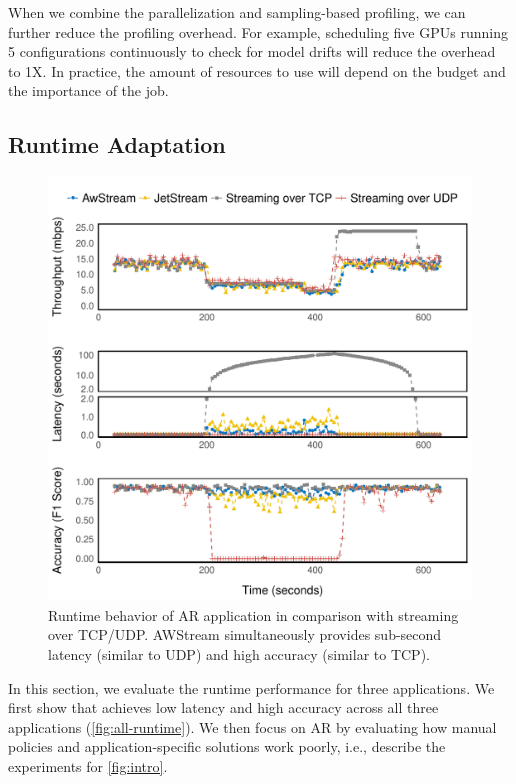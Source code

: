 When we combine the parallelization and sampling-based profiling, we can further
reduce the profiling overhead. For example, scheduling five GPUs running 5
configurations continuously to check for model drifts will reduce the overhead
to 1X\@. In practice, the amount of resources to use will depend on the budget
and the importance of the job.


\subsection{Runtime Adaptation}
\label{sec:runtime-adaptation}

\begin{figure}
  \centering
  \includegraphics[width=\columnwidth]{figures/runtime-darknet-verticle.pdf}
  \caption{Runtime behavior of AR application in comparison with streaming over
    TCP/UDP\@. AWStream simultaneously provides sub-second latency (similar to
    UDP) and high accuracy (similar to TCP).}
  \label{fig:ar-runtime}
\end{figure}

In this section, we evaluate the runtime performance for three applications. We
first show that \sysname{} achieves low latency and high accuracy across all
three applications (\autoref{fig:all-runtime}).
We then focus on AR by evaluating how manual policies and
application-specific solutions work poorly, i.e., describe the experiments for
\autoref{fig:intro}.

